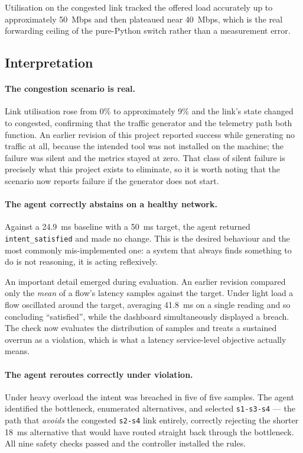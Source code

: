\documentclass[12pt,a4paper]{report}
\begin{document}
Utilisation on the congested link tracked the offered load accurately up to
approximately 50~Mbps and then plateaued near 40~Mbps, which is the real
forwarding ceiling of the pure-Python switch rather than a measurement error.

\subsection{Interpretation}

\paragraph{The congestion scenario is real.}
Link utilisation rose from 0\% to approximately 9\% and the link's state changed
to congested, confirming that the traffic generator and the telemetry path both
function. An earlier revision of this project reported success while generating
no traffic at all, because the intended tool was not installed on the machine;
the failure was silent and the metrics stayed at zero. That class of silent
failure is precisely what this project exists to eliminate, so it is worth
noting that the scenario now reports failure if the generator does not start.

\paragraph{The agent correctly abstains on a healthy network.}
Against a 24.9~ms baseline with a 50~ms target, the agent returned
\texttt{intent\_satisfied} and made no change. This is the desired behaviour and
the most commonly mis-implemented one: a system that always finds something to
do is not reasoning, it is acting reflexively.

An important detail emerged during evaluation. An earlier revision compared only
the \emph{mean} of a flow's latency samples against the target. Under light
load a flow oscillated around the target, averaging 41.8~ms on a single reading
and so concluding ``satisfied'', while the dashboard simultaneously displayed a
breach. The check now evaluates the distribution of samples and treats a
sustained overrun as a violation, which is what a latency service-level
objective actually means.

\paragraph{The agent reroutes correctly under violation.}
Under heavy overload the intent was breached in five of five samples. The agent
identified the bottleneck, enumerated alternatives, and selected
\texttt{s1-s3-s4} --- the path that \emph{avoids} the congested \texttt{s2-s4}
link entirely, correctly rejecting the shorter 18~ms alternative that would have
routed straight back through the bottleneck. All nine safety checks passed and
the controller installed the rules.
\end{document}
